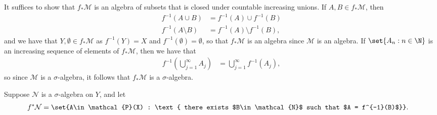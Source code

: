 \documentclass[10pt]{mypackage}
\begin{document}
\begin{solution}
  It suffices to show that $f_{\ast}\mathcal{M}$ is an algebra of subsets that is closed under countable increasing unions. If $A,B\in f_{\ast}\mathcal{M}$, then
  \begin{align*}
    f^{-1}\left( A\cup B \right) &= f^{-1}\left( A \right)\cup f^{-1}\left( B \right)\\
    f^{-1}\left( A\setminus B \right) &= f^{-1}\left( A \right)\setminus f^{-1}\left( B \right),
  \end{align*}
  and we have that $Y,\emptyset\in f_{\ast}\mathcal{M}$ as $f^{-1}\left( Y \right) = X$ and $f^{-1}\left( \emptyset \right) = \emptyset$, so that $f_{\ast}\mathcal{M}$ is an algebra since $\mathcal{M}$ is an algebra. If $\set{A_n : n\in \N}$ is an increasing sequence of elements of $f_{\ast}\mathcal{M}$, then we have that
  \begin{align*}
    f^{-1}\left( \bigcup_{j=1}^{\infty}A_j \right) &= \bigcup_{j=1}^{\infty}f^{-1}\left( A_j \right),
  \end{align*}
  so since $\mathcal{M}$ is a $\sigma$-algebra, it follows that $f_{\ast}\mathcal{M}$ is a $\sigma$-algebra.
\end{solution}
\begin{problem}
  Suppose $\mathcal{N}$ is a $\sigma$-algebra on $Y$, and let 
  \begin{align*}
    f^{\ast}\mathcal{N} &= \set{A\in \mathcal{P}(X) : \text{ there exists $B\in \mathcal{N}$ such that $A = f^{-1}(B)$}}.
  \end{align*}
\end{problem}
\end{document}
